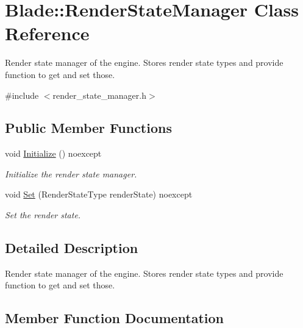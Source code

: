 \hypertarget{class_blade_1_1_render_state_manager}{}\section{Blade\+:\+:Render\+State\+Manager Class Reference}
\label{class_blade_1_1_render_state_manager}


Render state manager of the engine. Stores render state types and provide function to get and set those.  




{\ttfamily \#include $<$render\+\_\+state\+\_\+manager.\+h$>$}

\subsection*{Public Member Functions}
\begin{DoxyCompactItemize}
\item 
\mbox{\label{class_blade_1_1_render_state_manager_a0b26e9c469b8ec7289bb107effc95a8b}} 
void \hyperlink{class_blade_1_1_render_state_manager_a0b26e9c469b8ec7289bb107effc95a8b}{Initialize} () noexcept
\begin{DoxyCompactList}\small\item\em Initialize the render state manager. \end{DoxyCompactList}\item 
void \hyperlink{class_blade_1_1_render_state_manager_a3d2ef6c7f65efe5dc738db1f66650f0f}{Set} (Render\+State\+Type render\+State) noexcept
\begin{DoxyCompactList}\small\item\em Set the render state. \end{DoxyCompactList}\end{DoxyCompactItemize}


\subsection{Detailed Description}
Render state manager of the engine. Stores render state types and provide function to get and set those. 

\subsection{Member Function Documentation}
\mbox{\label{class_blade_1_1_render_state_manager_a3d2ef6c7f65efe5dc738db1f66650f0f}} 
